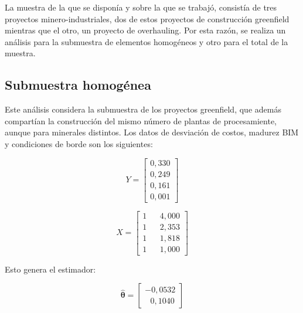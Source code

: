 La muestra de la que se disponía y sobre la que se trabajó, consistía de tres proyectos minero-industriales, dos de estos proyectos de construcción greenfield mientras que el otro, un proyecto de overhauling. Por esta razón, se realiza un análisis para la submuestra de elementos homogéneos y otro para el total de la muestra.

\subsection{Submuestra homogénea}

Este análisis considera la submuestra de los proyectos greenfield, que además compartían la construcción del mismo número de plantas de procesamiente, aunque para minerales distintos. Los datos de desviación de costos, madurez BIM y condiciones de borde son los siguientes:

\begin{minipage}{.45\linewidth}
    \begin{equation*}
    Y = 
        \begin{bmatrix}
            0,330 \\
            0,249 \\
            0,161 \\
            0,001 
        \end{bmatrix}
    \end{equation*}
\end{minipage}
\begin{minipage}{.45\linewidth}
    \begin{equation*}
    X = 
        \begin{bmatrix}
            1 & & 4,000 \\
            1 & & 2,353 \\
            1 & & 1,818 \\
            1 & & 1,000
        \end{bmatrix}
    \end{equation*}
\end{minipage}

Esto genera el estimador:

\begin{equation}
    \hat{\bm{\theta}} = 
        \begin{bmatrix}
            -0,0532 \\
            ~~~0,1040
        \end{bmatrix}
\end{equation}

